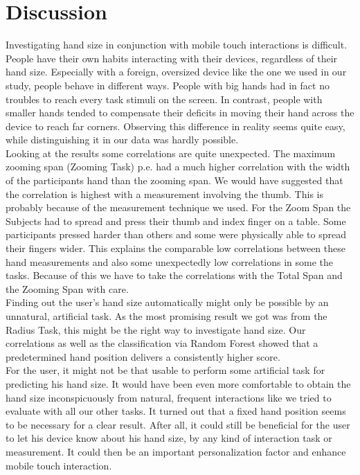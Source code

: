 \documentclass{sigchi}
\begin{document}
\section{Discussion}
Investigating hand size in conjunction with mobile touch interactions is difficult. People have their own habits interacting with their devices, regardless of their hand size. Especially with a foreign, oversized device like the one we used in our study, people behave in different ways. People with big hands had in fact no troubles to reach every task stimuli on the screen. In contrast, people with smaller hands tended to compensate their deficits in moving their hand across the device to reach far corners. Observing this difference in reality seems quite easy, while distinguishing it in our data was hardly possible.\\
Looking at the results some correlations are quite unexpected. The maximum zooming span (Zooming Task) p.e. had a much higher correlation with the width of the participants hand than the zooming span. We would have suggested that the correlation is highest with a measurement involving the thumb. This is probably because of the measurement technique we used. For the Zoom Span the Subjects had to spread and press their thumb and index finger on a table. Some participants pressed harder than others and some were physically able to spread their fingers wider. This explains the comparable low correlations between these hand measurements and also some unexpectedly low correlations in some the tasks. Because of this we have to take the correlations with the Total Span and the Zooming Span with care.\\
Finding out the user's hand size automatically might only be possible by an unnatural, artificial task. As the most promising result we got was from the Radius Task, this might be the right way to investigate hand size. Our correlations as well as the classification via Random Forest showed that a predetermined hand position delivers a consistently higher score.\\
For the user, it might not be that usable to perform some artificial task for predicting his hand size. It would have been even more comfortable to obtain the hand size inconspicuously from natural, frequent interactions like we tried to evaluate with all our other tasks. It turned out that a fixed hand position seems to be necessary for a clear result. After all, it could still be beneficial for the user to let his device know about his hand size, by any kind of interaction task or measurement. It could then be an important personalization factor and enhance mobile touch interaction.
\end{document}
